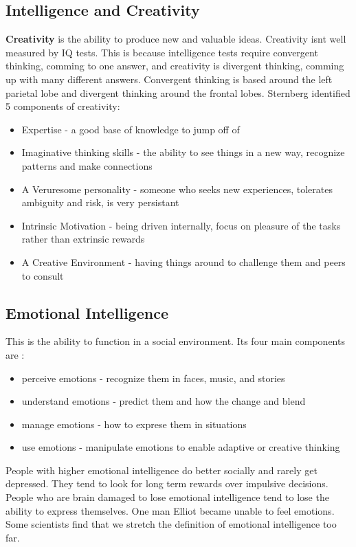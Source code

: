 \documentclass[12pt]{article}
\begin{document}
\subsection*{Intelligence and Creativity}
\textbf{Creativity} is the ability to produce new and valuable ideas. Creativity isnt well measured by IQ tests. This is because intelligence tests require convergent thinking, comming to one answer, and creativity is divergent thinking, comming up with many different answers. Convergent thinking is based around the left parietal lobe and divergent thinking around the frontal lobes. Sternberg identified 5 components of creativity:
\begin{itemize}
\item Expertise - a good base of knowledge to jump off of
\item Imaginative thinking skills - the ability to see things in a new way, recognize patterns and make connections
\item A Veruresome personality - someone who seeks new experiences, tolerates ambiguity and risk, is very persistant
\item Intrinsic Motivation - being driven internally, focus on pleasure of the tasks rather than extrinsic rewards
\item A Creative Environment - having things around to challenge them and peers to consult
\end{itemize}  
\subsection*{Emotional Intelligence}
This is the ability to function in a social environment. Its four main components are :
\begin{itemize}
\item perceive emotions - recognize them in faces, music, and stories
\item understand emotions - predict them and how the change and blend
\item manage emotions - how to exprese them in situations
\item use emotions - manipulate emotions to enable adaptive or creative thinking
\end{itemize}
People with higher emotional intelligence do better socially and rarely get depressed. They tend to look for long term rewards over impulsive decisions. People who are brain damaged to lose emotional intelligence tend to lose the ability to express themselves. One man Elliot became unable to feel emotions. Some scientists find that we stretch the definition of emotional intelligence too far.
\end{document}
